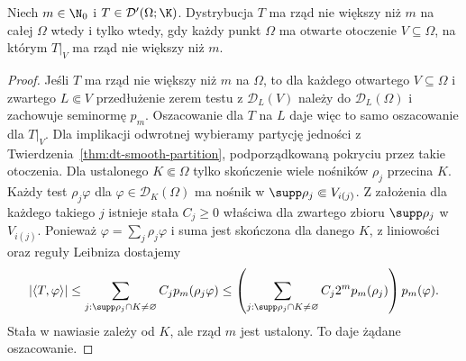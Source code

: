 \begin{twierdzenie}
\label{thm:dt-local-order-bound}
Niech $m\in\N_0$ i $T\in\mathcal D'(\Omega;\K)$.
Dystrybucja $T$ ma rząd nie większy niż $m$ na całej
$\Omega$ wtedy i tylko wtedy, gdy każdy punkt $\Omega$
ma otwarte otoczenie $V\subseteq\Omega$, na którym
$T|_V$ ma rząd nie większy niż $m$.
\end{twierdzenie}
\begin{proof}
Jeśli $T$ ma rząd nie większy niż $m$ na $\Omega$,
to dla każdego otwartego $V\subseteq\Omega$ i zwartego
$L\Subset V$ przedłużenie zerem testu z $\mathcal D_L(V)$
należy do $\mathcal D_L(\Omega)$ i zachowuje seminormę
$p_m$. Oszacowanie dla $T$ na $L$ daje więc to samo
oszacowanie dla $T|_V$. Dla implikacji odwrotnej wybieramy partycję
jedności z Twierdzenia~\ref{thm:dt-smooth-partition},
podporządkowaną pokryciu przez takie otoczenia.
Dla ustalonego $K\Subset\Omega$ tylko skończenie wiele
nośników $\rho_j$ przecina $K$. Każdy test
$\rho_j\varphi$ dla $\varphi\in\mathcal D_K(\Omega)$
ma nośnik w $\supp\rho_j\Subset V_{i(j)}$.
Z założenia dla każdego takiego $j$ istnieje stała
$C_j\ge0$ właściwa dla zwartego zbioru $\supp\rho_j$
w $V_{i(j)}$. Ponieważ $\varphi=\sum_j\rho_j\varphi$
i suma jest skończona dla danego $K$, z liniowości
oraz reguły Leibniza dostajemy
\[
 |\langle T,\varphi\rangle|
 \le \sum_{j:\supp\rho_j\cap K\ne\varnothing}
 C_j p_m(\rho_j\varphi)
 \le \left(\sum_{j:\supp\rho_j\cap K\ne\varnothing}
 C_j2^m p_m(\rho_j)\right)p_m(\varphi).
\]
Stała w nawiasie zależy od $K$, ale rząd $m$
jest ustalony. To daje żądane oszacowanie.
\end{proof}

